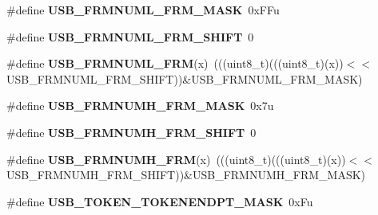 \begin{DoxyCompactItemize}
\item 
\#define {\bfseries U\+S\+B\+\_\+\+F\+R\+M\+N\+U\+M\+L\+\_\+\+F\+R\+M\+\_\+\+M\+A\+SK}~0x\+F\+Fu\hypertarget{group__USB__Register__Masks_ga197f6ef10431b69cb9b84fe7241a318a}{}\label{group__USB__Register__Masks_ga197f6ef10431b69cb9b84fe7241a318a}

\item 
\#define {\bfseries U\+S\+B\+\_\+\+F\+R\+M\+N\+U\+M\+L\+\_\+\+F\+R\+M\+\_\+\+S\+H\+I\+FT}~0\hypertarget{group__USB__Register__Masks_ga723c2de82420db0c349049ad6f66ad14}{}\label{group__USB__Register__Masks_ga723c2de82420db0c349049ad6f66ad14}

\item 
\#define {\bfseries U\+S\+B\+\_\+\+F\+R\+M\+N\+U\+M\+L\+\_\+\+F\+RM}(x)~(((uint8\+\_\+t)(((uint8\+\_\+t)(x))$<$$<$U\+S\+B\+\_\+\+F\+R\+M\+N\+U\+M\+L\+\_\+\+F\+R\+M\+\_\+\+S\+H\+I\+FT))\&U\+S\+B\+\_\+\+F\+R\+M\+N\+U\+M\+L\+\_\+\+F\+R\+M\+\_\+\+M\+A\+SK)\hypertarget{group__USB__Register__Masks_gadd68274e4e3aa3763c3a5c36737188ff}{}\label{group__USB__Register__Masks_gadd68274e4e3aa3763c3a5c36737188ff}

\item 
\#define {\bfseries U\+S\+B\+\_\+\+F\+R\+M\+N\+U\+M\+H\+\_\+\+F\+R\+M\+\_\+\+M\+A\+SK}~0x7u\hypertarget{group__USB__Register__Masks_ga436241a677d27ecae3001b228b51f536}{}\label{group__USB__Register__Masks_ga436241a677d27ecae3001b228b51f536}

\item 
\#define {\bfseries U\+S\+B\+\_\+\+F\+R\+M\+N\+U\+M\+H\+\_\+\+F\+R\+M\+\_\+\+S\+H\+I\+FT}~0\hypertarget{group__USB__Register__Masks_gacb18c63687d37e245a79d7e7551823a3}{}\label{group__USB__Register__Masks_gacb18c63687d37e245a79d7e7551823a3}

\item 
\#define {\bfseries U\+S\+B\+\_\+\+F\+R\+M\+N\+U\+M\+H\+\_\+\+F\+RM}(x)~(((uint8\+\_\+t)(((uint8\+\_\+t)(x))$<$$<$U\+S\+B\+\_\+\+F\+R\+M\+N\+U\+M\+H\+\_\+\+F\+R\+M\+\_\+\+S\+H\+I\+FT))\&U\+S\+B\+\_\+\+F\+R\+M\+N\+U\+M\+H\+\_\+\+F\+R\+M\+\_\+\+M\+A\+SK)\hypertarget{group__USB__Register__Masks_gafe9face0ec6a617199ad76945c034da8}{}\label{group__USB__Register__Masks_gafe9face0ec6a617199ad76945c034da8}

\item 
\#define {\bfseries U\+S\+B\+\_\+\+T\+O\+K\+E\+N\+\_\+\+T\+O\+K\+E\+N\+E\+N\+D\+P\+T\+\_\+\+M\+A\+SK}~0x\+Fu\hypertarget{group__USB__Register__Masks_gaa0d3bc1d6ff63ebbccad8b898e39cc84}{}\label{group__USB__Register__Masks_gaa0d3bc1d6ff63ebbccad8b898e39cc84}


\end{DoxyCompactItemize}
